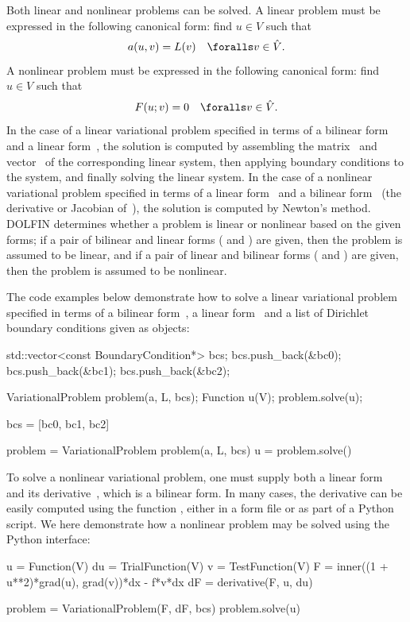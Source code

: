 Both linear and nonlinear problems can be solved. A linear problem
must be expressed in the following canonical form: find $u \in V$ such
that
\begin{equation}
  a(u, v) = L(v) \quad \foralls v \in \hat{V}.
\end{equation}
A nonlinear problem must be expressed in the following canonical form:
find $u \in V$ such that
\begin{equation}
  F(u; v) = 0 \quad \foralls v \in \hat{V}.
\end{equation}
In the case of a linear variational problem specified in terms of a
bilinear form~ and a linear form~, the solution is
computed by assembling the matrix~ and vector~ of the
corresponding linear system, then applying boundary conditions to the
system, and finally solving the linear system. In the case of a
nonlinear variational problem specified in terms of a linear
form~ and a bilinear form~ (the derivative or Jacobian
of~), the solution is computed by Newton's method. DOLFIN
determines whether a problem is linear or nonlinear based on the given
forms; if a pair of bilinear and linear forms ( and )
are given, then the problem is assumed to be linear, and if a pair of
linear and bilinear forms ( and ) are given, then the
problem is assumed to be nonlinear.

The code examples below demonstrate how to solve a linear variational
problem specified in terms of a bilinear form~, a linear
form~ and a list of Dirichlet boundary conditions given as
 objects:
\begin{c++}
std::vector<const BoundaryCondition*> bcs;
bcs.push_back(&bc0);
bcs.push_back(&bc1);
bcs.push_back(&bc2);

VariationalProblem problem(a, L, bcs);
Function u(V);
problem.solve(u);
\end{c++}
\begin{python}
bcs = [bc0, bc1, bc2]

problem = VariationalProblem problem(a, L, bcs)
u = problem.solve()
\end{python}

To solve a nonlinear variational problem, one must supply both a linear
form~ and its derivative~, which is a bilinear form. In
many cases, the derivative can be easily computed using the function
, either in a  form file or as part of a Python
script. We here demonstrate how a nonlinear problem may be solved using
the Python interface:
\begin{python}
u  = Function(V)
du = TrialFunction(V)
v  = TestFunction(V)
F  = inner((1 + u**2)*grad(u), grad(v))*dx - f*v*dx
dF = derivative(F, u, du)

problem = VariationalProblem(F, dF, bcs)
problem.solve(u)
\end{python}

